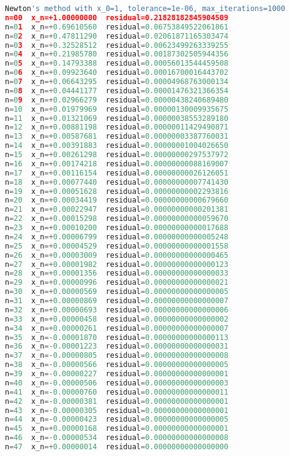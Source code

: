 \documentclass{article}
\begin{document}
\begin{enumerate}[label=(\alph*)]
\begin{lstlisting}[language=Python]
Newton's method with x_0=1, tolerance=1e-06, max_iterations=1000
n=00  x_n=+1.00000000  residual=0.21828182845904509
n=01  x_n=+0.69610560  residual=0.06753849522061861
n=02  x_n=+0.47811290  residual=0.02061871165303474
n=03  x_n=+0.32528512  residual=0.00623499263339255
n=04  x_n=+0.21985780  residual=0.00187302505944356
n=05  x_n=+0.14793388  residual=0.00056013544459508
n=06  x_n=+0.09923640  residual=0.00016700016443702
n=07  x_n=+0.06643295  residual=0.00004968763000134
n=08  x_n=+0.04441177  residual=0.00001476321366354
n=09  x_n=+0.02966279  residual=0.00000438240689480
n=10  x_n=+0.01979969  residual=0.00000130009935675
n=11  x_n=+0.01321069  residual=0.00000038553289180
n=12  x_n=+0.00881198  residual=0.00000011429490871
n=13  x_n=+0.00587681  residual=0.00000003387760031
n=14  x_n=+0.00391883  residual=0.00000001004026650
n=15  x_n=+0.00261298  residual=0.00000000297537972
n=16  x_n=+0.00174218  residual=0.00000000088169007
n=17  x_n=+0.00116154  residual=0.00000000026126051
n=18  x_n=+0.00077440  residual=0.00000000007741430
n=19  x_n=+0.00051628  residual=0.00000000002293816
n=20  x_n=+0.00034419  residual=0.00000000000679660
n=21  x_n=+0.00022947  residual=0.00000000000201381
n=22  x_n=+0.00015298  residual=0.00000000000059670
n=23  x_n=+0.00010200  residual=0.00000000000017688
n=24  x_n=+0.00006799  residual=0.00000000000005248
n=25  x_n=+0.00004529  residual=0.00000000000001558
n=26  x_n=+0.00003009  residual=0.00000000000000465
n=27  x_n=+0.00001982  residual=0.00000000000000123
n=28  x_n=+0.00001356  residual=0.00000000000000033
n=29  x_n=+0.00000996  residual=0.00000000000000021
n=30  x_n=+0.00000569  residual=0.00000000000000005
n=31  x_n=+0.00000869  residual=0.00000000000000007
n=32  x_n=+0.00000693  residual=0.00000000000000006
n=33  x_n=+0.00000458  residual=0.00000000000000002
n=34  x_n=+0.00000261  residual=0.00000000000000007
n=35  x_n=-0.00001870  residual=0.00000000000000113
n=36  x_n=-0.00001223  residual=0.00000000000000031
n=37  x_n=-0.00000805  residual=0.00000000000000008
n=38  x_n=-0.00000566  residual=0.00000000000000005
n=39  x_n=-0.00000227  residual=0.00000000000000001
n=40  x_n=-0.00000506  residual=0.00000000000000003
n=41  x_n=-0.00000760  residual=0.00000000000000011
n=42  x_n=-0.00000381  residual=0.00000000000000001
n=43  x_n=-0.00000305  residual=0.00000000000000001
n=44  x_n=-0.00000423  residual=0.00000000000000005
n=45  x_n=+0.00000168  residual=0.00000000000000001
n=46  x_n=-0.00000534  residual=0.00000000000000008
n=47  x_n=+0.00000014  residual=0.00000000000000000


\end{lstlisting}
\end{enumerate}
\end{document}
